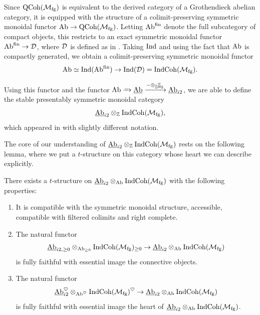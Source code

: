 \begin{cnstr}
  Since $\mathrm{QCoh}(\mathcal{M}_{\mathrm{fg}})$ is equivalent to the derived category of a Grothendieck abelian category, it is equipped with the structure of a colimit-preserving symmetric monoidal functor $\mathrm{Ab} \to \mathrm{QCoh}(\mathcal{M}_{\mathrm{fg}})$.
  Letting $\mathrm{Ab} ^{\mathrm{fin}}$ denote the full subcategory of compact objects, this restricts to an exact symmetric monoidal functor $\mathrm{Ab} ^{\mathrm{fin}} \to \operatorname{\mathcal{D}}$, where $\operatorname{\mathcal{D}}$ is defined as in .
  Taking $\mathrm{Ind}$ and using the fact that $\mathrm{Ab}$ is compactly generated, we obtain a colimit-preserving symmetric monoidal functor
  \[\mathrm{Ab} \simeq \mathrm{Ind}(\mathrm{Ab} ^{\mathrm{fin}}) \to \mathrm{Ind}(\operatorname{\mathcal{D}}) = \mathrm{IndCoh}(\mathcal{M}_{\mathrm{fg}}).\]

  Using this functor and the functor $\mathrm{Ab} \xrightarrow{\_} \underline{\mathrm{Ab}} \xrightarrow{- \otimes_{\underline{\mathbb{Z}}} \underline{\mathbb{Z}}_{2}} \underline{\mathrm{Ab}}_{i2}$, we are able to define the stable presentably symmetric monoidal category
  \[\underline{\mathrm{Ab}}_{i2} \otimes_{\mathbb{Z}} \mathrm{IndCoh}(\mathcal{M}_{\mathrm{fg}}),\]
  which appeared in  with slightly different notation.
\end{cnstr}

The core of our understanding of $\underline{\mathrm{Ab}}_{i2} \otimes_{\mathbb{Z}} \mathrm{IndCoh}(\mathcal{M}_{\mathrm{fg}})$ rests on the following lemma, where we put a $t$-structure on this category whose heart we can describe explicitly.

\begin{lem} \label{lem:Cta-t-structure}
  There exists a $t$-structure on $\underline{\mathrm{Ab}}_{i2} \otimes_{\mathrm{Ab}} \mathrm{IndCoh}(\mathcal{M}_{\mathrm{fg}})$ with the following properties:
  \begin{enumerate}
    \item It is compatible with the symmetric monoidal structure, accessible, compatible with filtered colimits and right complete.
    \item The natural functor
      \[\underline{\mathrm{Ab}}_{i2, \geq 0} \otimes _{\mathrm{Ab}_{\geq 0}} \mathrm{IndCoh}(\mathcal{M}_{\mathrm{fg}})_{\geq 0} \to \underline{\mathrm{Ab}}_{i2} \otimes_{\mathrm{Ab}} \mathrm{IndCoh}(\mathcal{M}_{\mathrm{fg}})\]
      is fully faithful with essential image the connective objects.
    \item The natural functor
      \[\underline{\mathrm{Ab}}_{i2} ^{\heartsuit} \otimes_{\mathrm{Ab}^{\heartsuit}} \mathrm{IndCoh}(\mathcal{M}_{\mathrm{fg}})^{\heartsuit} \to \underline{\mathrm{Ab}}_{i2} \otimes_{\mathrm{Ab}} \mathrm{IndCoh}(\mathcal{M}_{\mathrm{fg}})\]
      is fully faithful with essential image the heart of $\underline{\mathrm{Ab}}_{i2} \otimes_{\mathrm{Ab}} \mathrm{IndCoh}(\mathcal{M}_{\mathrm{fg}})$.
  \end{enumerate}
\end{lem}

